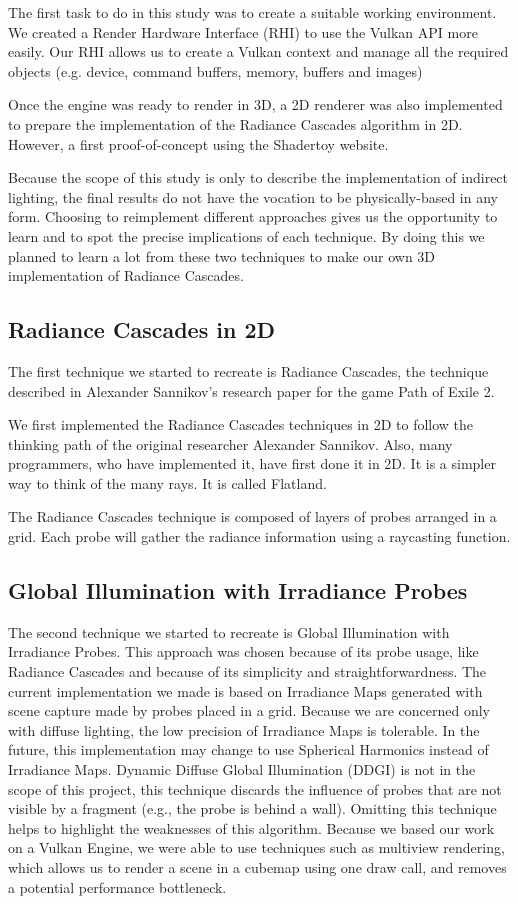 \documentclass{rapportCS}
\begin{document}
The first task to do in this study was to create a suitable working environment. We created a Render Hardware Interface (RHI) to use the Vulkan API more easily. Our RHI allows us to create a Vulkan context and manage all the required objects (e.g. device, command buffers, memory, buffers and images)

Once the engine was ready to render in 3D, a 2D renderer was also implemented to prepare the implementation of the Radiance Cascades algorithm in 2D. However, a first proof-of-concept using the Shadertoy website.

Because the scope of this study is only to describe the implementation of indirect lighting, the final results do not have the vocation to be physically-based in any form.
Choosing to reimplement different approaches gives us the opportunity to learn and to spot the precise implications of each technique. By doing this we planned to learn a lot from these two techniques to make our own 3D implementation of Radiance Cascades.

\subsection{Radiance Cascades in 2D}
The first technique we started to recreate is Radiance Cascades, the technique described in Alexander Sannikov’s research paper for the game Path of Exile 2.

We first implemented the Radiance Cascades techniques in 2D to follow the thinking path of the original researcher Alexander Sannikov. Also, many programmers, who have implemented it, have first done it in 2D. It is a simpler way to think of the many rays. It is called Flatland.

The Radiance Cascades technique is composed of layers of probes arranged in a grid. Each probe will gather the radiance information using a raycasting function.

\subsection{Global Illumination with Irradiance Probes}
The second technique we started to recreate is Global Illumination with Irradiance Probes. This approach was chosen because of its probe usage, like Radiance Cascades and because of its simplicity and straightforwardness.
The current implementation we made is based on Irradiance Maps generated with scene capture made by probes placed in a grid. Because we are concerned only with diffuse lighting, the low precision of Irradiance Maps is tolerable. In the future, this implementation may change to use Spherical Harmonics instead of Irradiance Maps.
Dynamic Diffuse Global Illumination (DDGI) is not in the scope of this project, this technique discards the influence of probes that are not visible by a fragment (e.g., the probe is behind a wall). Omitting this technique helps to highlight the weaknesses of this algorithm.
Because we based our work on a Vulkan Engine, we were able to use techniques such as multiview rendering, which allows us to render a scene in a cubemap using one draw call, and removes a potential performance bottleneck.
\end{document}
